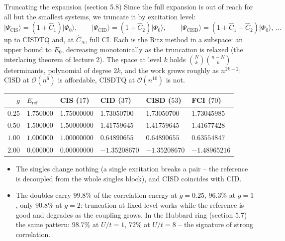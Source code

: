 \documentclass[aspectratio=169,10pt]{beamer}
\newcommand{\ket}[1]{\vert #1\rangle}
\begin{document}
\begin{frame}{Truncating the expansion (section 5.8)}
  \footnotesize
  Since the full expansion is out of reach for all but the smallest systems, we truncate it by excitation level:
  \[
    \ket{\Psi_{\mathrm{CIS}}}=(1+\hat{C}_1)\ket{\Phi_0},\qquad
    \ket{\Psi_{\mathrm{CID}}}=(1+\hat{C}_2)\ket{\Phi_0},\qquad
    \ket{\Psi_{\mathrm{CISD}}}=(1+\hat{C}_1+\hat{C}_2)\ket{\Phi_0},\ \dots
  \]
  up to CISDTQ and, at $\hat{C}_N$, full CI. Each is the Ritz method in a subspace: an upper bound to $E_0$, decreasing monotonically as the truncation is relaxed (the interlacing theorem of lecture 2). The space at level $k$ holds $\binom{N}{k}\binom{n-N}{k}$ determinants, polynomial of degree $2k$, and the work grows roughly as $n^{2k+2}$: CISD at $\mathcal{O}(n^6)$ is affordable, CISDTQ at $\mathcal{O}(n^{10})$ is not.
  \begin{center}
  \renewcommand{\arraystretch}{1.15}
  \begin{tabular}{rlllll}
    \toprule
    $g$ & $E_{\mathrm{ref}}$ & CIS ($17$) & CID ($37$) & CISD ($53$) & FCI ($70$)\\
    \midrule
    $0.25$ & $1.750000$ & $1.75000000$ & $1.73050700$ & $1.73050700$ & $1.73045985$\\
    $0.50$ & $1.500000$ & $1.50000000$ & $1.41759645$ & $1.41759645$ & $1.41677428$\\
    $1.00$ & $1.000000$ & $1.00000000$ & $0.64890655$ & $0.64890655$ & $0.63554847$\\
    $2.00$ & $0.000000$ & $0.00000000$ & $-1.35208670$ & $-1.35208670$ & $-1.48965216$\\
    \bottomrule
  \end{tabular}
  \end{center}
  \begin{itemize}
    \item The singles change nothing (a single excitation breaks a pair -- the reference is decoupled from the whole singles block), and CISD coincides with CID.
    \item The doubles carry $99.8\%$ of the correlation energy at $g=0.25$, $96.3\%$ at $g=1$, only $90.8\%$ at $g=2$: truncation at fixed level works while the reference is good and degrades as the coupling grows. In the Hubbard ring (section 5.7) the same pattern: $98.7\%$ at $U/t=1$, $72\%$ at $U/t=8$ -- the signature of \alert{strong correlation}.
  \end{itemize}
\end{frame}
\end{document}
